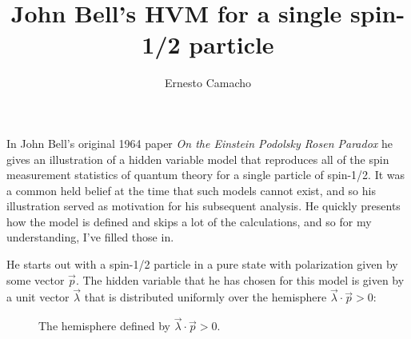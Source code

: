 \documentclass[a4paper]{article}
\title{John Bell's HVM for a single spin-1/2 particle}
\author{Ernesto Camacho}
\begin{document}
    \maketitle

    In John Bell's original 1964 paper \textit{On the
    Einstein Podolsky Rosen Paradox} he gives an
    illustration of a hidden variable model that reproduces
    all of the spin measurement statistics of quantum theory
    for a single particle of spin-1/2. It was a common held
    belief at the time that such models cannot exist, and so
    his illustration served as motivation for his subsequent
    analysis. He quickly presents how the model is defined
    and skips a lot of the calculations, and so for my
    understanding, I've filled those in. 

    He starts out with a spin-1/2 particle in a pure state
    with polarization given by some vector $\vec p$. The
    hidden variable that he has chosen for this model is
    given by a unit vector $\vec \lambda$ that is
    distributed uniformly over the hemisphere $\vec \lambda
    \cdot \vec p > 0$:

    \begin{figure}[ht]
        \centering



        \caption{The hemisphere defined by $\vec \lambda
        \cdot \vec p > 0$.}
        \label{fig:hemi}
    \end{figure}
\end{document}
